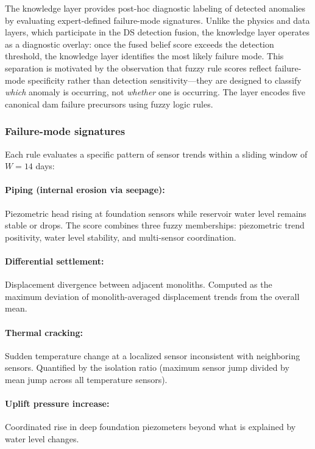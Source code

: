 \documentclass[preprint,12pt,review]{elsarticle}
\begin{document}
The knowledge layer provides post-hoc diagnostic labeling of detected anomalies by evaluating expert-defined failure-mode signatures. Unlike the physics and data layers, which participate in the DS detection fusion, the knowledge layer operates as a diagnostic overlay: once the fused belief score exceeds the detection threshold, the knowledge layer identifies the most likely failure mode. This separation is motivated by the observation that fuzzy rule scores reflect failure-mode specificity rather than detection sensitivity---they are designed to classify \emph{which} anomaly is occurring, not \emph{whether} one is occurring. The layer encodes five canonical dam failure precursors using fuzzy logic rules.

\subsubsection{Failure-mode signatures}

Each rule evaluates a specific pattern of sensor trends within a sliding window of $W = 14$ days:

\paragraph{Piping (internal erosion via seepage):} Piezometric head rising at foundation sensors while reservoir water level remains stable or drops. The score combines three fuzzy memberships: piezometric trend positivity, water level stability, and multi-sensor coordination.

\paragraph{Differential settlement:} Displacement divergence between adjacent monoliths. Computed as the maximum deviation of monolith-averaged displacement trends from the overall mean.

\paragraph{Thermal cracking:} Sudden temperature change at a localized sensor inconsistent with neighboring sensors. Quantified by the isolation ratio (maximum sensor jump divided by mean jump across all temperature sensors).

\paragraph{Uplift pressure increase:} Coordinated rise in deep foundation piezometers beyond what is explained by water level changes.
\end{document}
